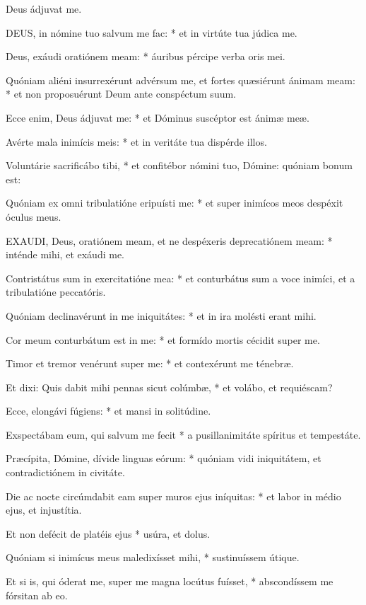  Deus ádjuvat me.


\lettrine[lines=2]{D}{EUS}, in nómine tuo salvum me fac: * et in virtúte tua júdica me.

Deus, exáudi oratiónem meam: * áuribus pércipe verba oris mei.

Quóniam aliéni insurrexérunt advérsum me, et fortes quæsiérunt ánimam meam: * et non proposuérunt Deum ante conspéctum suum.

Ecce enim, Deus ádjuvat me: * et Dóminus suscéptor est ánimæ meæ.

Avérte mala inimícis meis: * et in veritáte tua dispérde illos.

Voluntárie sacrificábo tibi, * et confitébor nómini tuo, Dómine: quóniam bonum est:

Quóniam ex omni tribulatióne eripuísti me: * et super inimícos meos despéxit óculus meus.


\lettrine[lines=2]{E}{XAUDI}, Deus, oratiónem meam, et ne despéxeris deprecatiónem meam: * inténde mihi, et exáudi me.

Contristátus sum in exercitatióne mea: * et conturbátus sum a voce inimíci, et a tribulatióne peccatóris.

Quóniam declinavérunt in me iniquitátes: * et in ira molésti erant mihi.

Cor meum conturbátum est in me: * et formído mortis cécidit super me.

Timor et tremor venérunt super me: * et contexérunt me ténebræ.

Et dixi: Quis dabit mihi pennas sicut colúmbæ, * et volábo, et requiéscam?

Ecce, elongávi fúgiens: * et mansi in solitúdine.

Exspectábam eum, qui salvum me fecit * a pusillanimitáte spíritus et tempestáte.

Præcípita, Dómine, dívide linguas eórum: * quóniam vidi iniquitátem, et contradictiónem in civitáte.

Die ac nocte circúmdabit eam super muros ejus iníquitas: * et labor in médio ejus, et injustítia.

Et non defécit de platéis ejus * usúra, et dolus.

Quóniam si inimícus meus maledixísset mihi, * sustinuíssem útique.

Et si is, qui óderat me, super me magna locútus fuísset, * abscondíssem me fórsitan ab eo.

